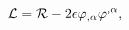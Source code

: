 \begin{equation}
  \label{eq:action}
{\cal L} = {\cal R} -2 \epsilon\varphi_{,\alpha}\varphi^{,\alpha} ,
\end{equation}

